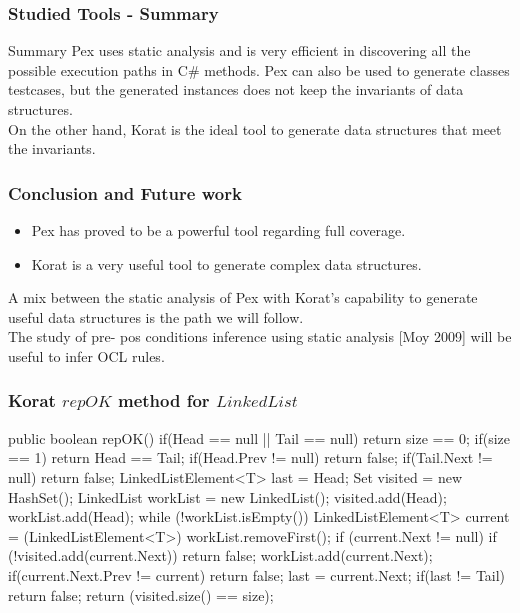 \documentclass{beamer}
\begin{document}
\begin{frame}[fragile]\frametitle{Studied Tools - Summary}
\begin{block}{Summary}
Pex uses static analysis and is very efficient in discovering all the possible execution paths in C\# methods.
Pex can also be used to generate classes testcases, but the generated instances does not keep the invariants of data structures.\\

On the other hand, Korat is the ideal tool to generate data structures that meet the invariants.
\end{block}
\end{frame}

\begin{frame} \frametitle{Conclusion and Future work}
\begin{itemize}
\item Pex has proved to be a powerful tool regarding full coverage.
\item Korat is a very useful tool to generate complex data structures.
\end{itemize}
A mix between the static analysis of Pex with Korat's capability to generate useful data structures is the path we will follow.\\

The study of pre- pos conditions inference using static analysis [Moy 2009] will be useful to infer OCL rules.
\end{frame}

\begin{frame}[fragile] \frametitle{Korat $repOK$ method for $LinkedList$}
\begin{code}
public boolean repOK() {
  if(Head == null || Tail == null)
    return size == 0;
  if(size == 1) return Head == Tail;
  if(Head.Prev != null) return false;
  if(Tail.Next != null) return false;
  LinkedListElement<T> last = Head;
  Set visited = new HashSet();
  LinkedList workList = new LinkedList();
  visited.add(Head);
  workList.add(Head);
  while (!workList.isEmpty()) {
    LinkedListElement<T> current = (LinkedListElement<T>) workList.removeFirst();
    if (current.Next != null) {
      if (!visited.add(current.Next))
	    return false;
      workList.add(current.Next);
      if(current.Next.Prev != current) return false;
      last = current.Next;
    }
  }
  if(last != Tail)
    return false;
  return (visited.size() == size);
}
\end{code}
\end{frame}
\end{document}
